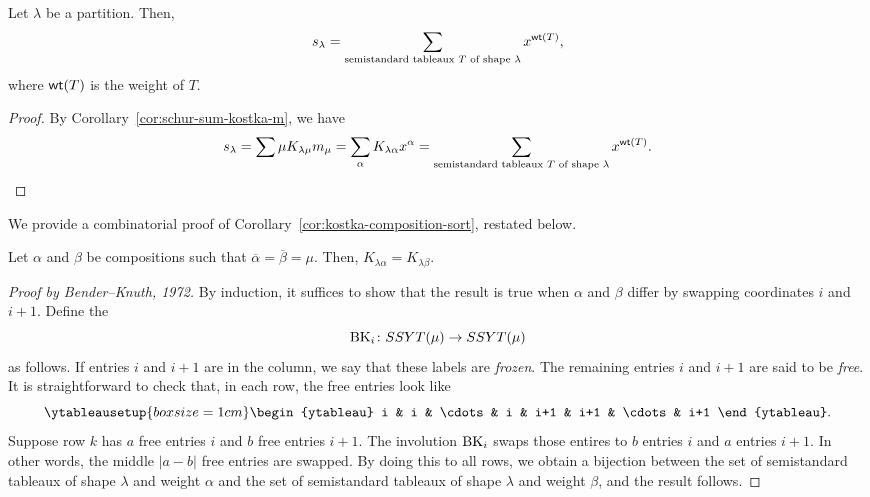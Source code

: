 \begin{corollary}
    Let \(\lambda\) be a partition.
    Then,
    \begin{equation}
        s_{\lambda} = \sum_{\text{semistandard tableaux } T \text{ of shape } \lambda} x^{\operatorname{\mathsf{wt}}(T)},
    \end{equation}
    where \(\operatorname{\mathsf{wt}}(T)\) is the weight of \(T\).
\end{corollary}

\begin{proof}
    By Corollary~\ref{cor:schur-sum-kostka-m}, we have
    \begin{equation}
        s_{\lambda} = \sum{\mu} K_{\lambda \mu} m_{\mu}
        = \sum_{\alpha} K_{\lambda \alpha} x^{\alpha}
        = \sum_{\text{semistandard tableaux } T \text{ of shape } \lambda} x^{\operatorname{\mathsf{wt}}(T)}. \qedhere
    \end{equation}
\end{proof}

We provide a combinatorial proof of Corollary~\ref{cor:kostka-composition-sort}, restated below.
\begin{fact}
    Let \(\alpha\) and \(\beta\) be compositions such that \(\overline{\alpha} = \overline{\beta} = \mu\).  Then, \(K_{\lambda \alpha} = K_{\lambda \beta}\).
\end{fact}
\begin{proof}[Proof by Bender--Knuth, 1972]
    By induction, it suffices to show that the result is true when \(\alpha\) and \(\beta\) differ by swapping coordinates \(i\) and \(i+1\).
    Define the 
    \begin{equation}
        \operatorname{BK}_{i} \colon SSYT(\mu) \to SSYT(\mu)
    \end{equation}
    as follows.
    If entries \(i\) and \(i+1\) are in the column, we say that these labels are \emph{frozen}.
    The remaining entries \(i\) and \(i+1\) are said to be \emph{free}.
    It is straightforward to check that, in each row, the free entries look like
    \begin{equation}
        \ytableausetup{boxsize=1cm}
        \begin{ytableau}
            i & i & \cdots & i & i+1 & i+1 & \cdots & i+1
        \end{ytableau}.
    \end{equation}
    Suppose row \(k\) has \(a\) free entries \(i\) and \(b\) free entries \(i+1\).
    The involution \(\operatorname{BK}_{i}\) swaps those entires to \(b\) entries \(i\) and \(a\) entries \(i+1\).
    In other words, the middle \(|a-b|\) free entries are swapped.
    By doing this to all rows, we obtain a bijection between the set of semistandard tableaux of shape \(\lambda\) and weight \(\alpha\) and the set of semistandard tableaux of shape \(\lambda\) and weight \(\beta\), and the result follows.
\end{proof}

